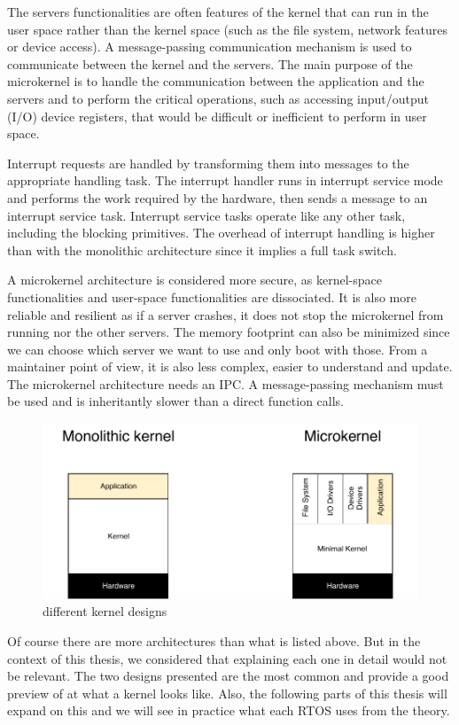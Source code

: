 The servers functionalities are often features of the kernel that can run in the user space
    rather than the kernel space (such as the file system, network features or device access)\cite{musaddiq2018survey}.
A message-passing communication mechanism is used to communicate between the kernel and the servers.
The main purpose of the microkernel is to handle the communication between the application and the servers
    and to perform the critical operations, such as accessing input/output (I/O) device registers, that would be difficult or inefficient to perform in user space.

Interrupt requests are handled by transforming them into messages to the appropriate handling task.
The interrupt handler runs in interrupt service mode and performs the work required by the hardware, then sends a message to an interrupt service task.
Interrupt service tasks operate like any other task, including the blocking primitives.
The overhead of interrupt handling is higher than with the monolithic architecture since it implies a full task switch.

A microkernel architecture is considered more secure, as kernel-space functionalities and user-space functionalities are dissociated.
It is also more reliable and resilient as if a server crashes, it does not stop the microkernel from running nor the other servers.
The memory footprint can also be minimized since we can choose which server we want to use and only boot with those.
From a maintainer point of view, it is also less complex, easier to understand and update\cite{OS_for_iot}\cite{comparison_iot_constrained_devices}.
The microkernel architecture needs an IPC.
A message-passing mechanism must be used and is inheritantly slower than a direct function calls.
\\
\begin{figure}[!h]
    \centering
    \includegraphics[scale=0.8]{assets/kernel_types.pdf}
    \caption{\label{fig:kernel-types}different kernel designs}
\end{figure}

Of course there are more architectures than what is listed above.
But in the context of this thesis, we considered that explaining each one in detail would not be relevant.
The two designs presented are the most common and provide a good preview of at what a kernel looks like.
Also, the following parts of this thesis will expand on this
    and we will see in practice what each RTOS uses from the theory.
